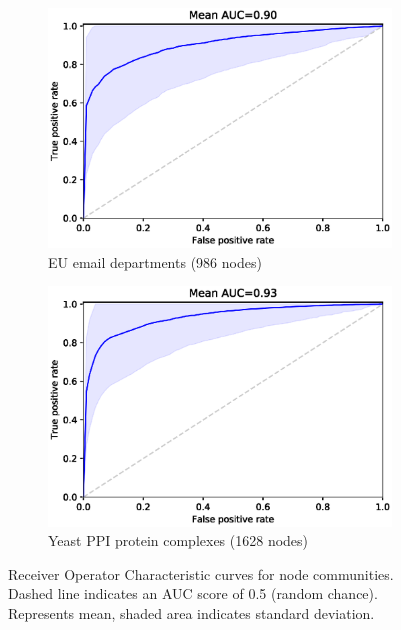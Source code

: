 \documentclass[a4paper,10pt]{article}
\begin{document}
\begin{figure}[ht]
     \centering
    \begin{subfigure}[b]{0.8\textwidth}
        \centering
        \includegraphics[width=\textwidth]{images/eu_email_nodewise_roc.eps}
        \caption{EU email departments (986 nodes)}
    \end{subfigure}
    
    \centering
    \begin{subfigure}[b]{0.8\textwidth}
        \centering
        \includegraphics[width=\textwidth]{images/yeast_ppi_nodewise_roc.eps}
        \caption{Yeast PPI protein complexes (1628 nodes)}
    \end{subfigure}
    
    \caption{Receiver Operator Characteristic curves for node communities.
    Dashed line indicates an AUC score of 0.5 (random chance).
    Represents mean, shaded area indicates standard deviation.
    }
    \label{fig:real_network_nodwise_classifiers}
\end{figure}
\end{document}
